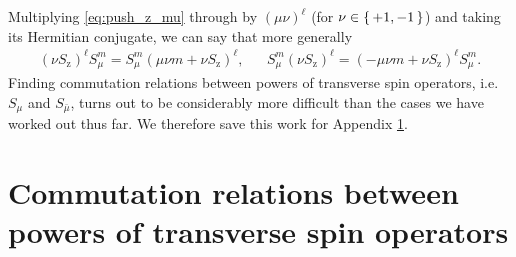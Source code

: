 \documentclass[pra,twocolumn,longbibliography]{revtex4-2}
\newcommand{\p}[1]{\left( #1 \right)} %
\newcommand{\z}{\text{z}}
\newcommand{\bmu}{{\bar\mu}}
\newcommand{\1}{\mathds{1}}
\begin{document}
Multiplying \eqref{eq:push_z_mu} through by $\p{\mu\nu}^\ell$ (for
$\nu\in\set{+1,-1}$) and taking its Hermitian conjugate, we can say
that more generally
\begin{align}
  \p{\nu S_\z}^\ell S_\mu^m
  = S_\mu^m \p{\mu\nu m+\nu S_\z}^\ell,
  &&
  S_\mu^m \p{\nu S_\z}^\ell
  = \p{-\mu\nu m+\nu S_\z}^\ell S_\mu^m.
\end{align}
Finding commutation relations between powers of transverse spin
operators, i.e.~$S_\mu$ and $S_\bmu$, turns out to be considerably
more difficult than the cases we have worked out thus far.  We
therefore save this work for Appendix \ref{sec:comm_transverse}.


\section{Commutation relations between powers of transverse spin
  operators}
\label{sec:comm_transverse}
\end{document}
